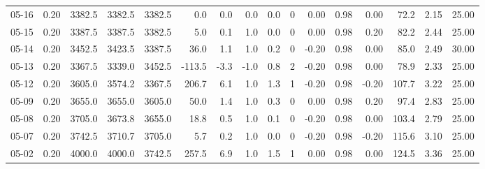\begin{threeparttable}
{\begin{tabular}{lrrrrrrrrrrrrrrr}
  05-16 &     0.20 & 3382.5 & 3382.5 & 3382.5 &        0.0 &            0.0 &                      0.0 &                 0.0 &              0 &       0.00 &      0.98 &           0.00 &             72.2 &            2.15 &                  25.00 \\
  05-15 &     0.20 & 3387.5 & 3387.5 & 3382.5 &        5.0 &            0.1 &                      1.0 &                 0.0 &              0 &       0.00 &      0.98 &           0.20 &             82.2 &            2.44 &                  25.00 \\
  05-14 &     0.20 & 3452.5 & 3423.5 & 3387.5 &       36.0 &            1.1 &                      1.0 &                 0.2 &              0 &      -0.20 &      0.98 &           0.00 &             85.0 &            2.49 &                  30.00 \\
  05-13 &     0.20 & 3367.5 & 3339.0 & 3452.5 &     -113.5 &           -3.3 &                     -1.0 &                 0.8 &              2 &      -0.20 &      0.98 &           0.00 &             78.9 &            2.33 &                  25.00 \\
  05-12 &     0.20 & 3605.0 & 3574.2 & 3367.5 &      206.7 &            6.1 &                      1.0 &                 1.3 &              1 &      -0.20 &      0.98 &          -0.20 &            107.7 &            3.22 &                  25.00 \\
  05-09 &     0.20 & 3655.0 & 3655.0 & 3605.0 &       50.0 &            1.4 &                      1.0 &                 0.3 &              0 &       0.00 &      0.98 &           0.20 &             97.4 &            2.83 &                  25.00 \\
  05-08 &     0.20 & 3705.0 & 3673.8 & 3655.0 &       18.8 &            0.5 &                      1.0 &                 0.1 &              0 &      -0.20 &      0.98 &           0.00 &            103.4 &            2.79 &                  25.00 \\
  05-07 &     0.20 & 3742.5 & 3710.7 & 3705.0 &        5.7 &            0.2 &                      1.0 &                 0.0 &              0 &      -0.20 &      0.98 &          -0.20 &            115.6 &            3.10 &                  25.00 \\
  05-02 &     0.20 & 4000.0 & 4000.0 & 3742.5 &      257.5 &            6.9 &                      1.0 &                 1.5 &              1 &       0.00 &      0.98 &           0.00 &            124.5 &            3.36 &                  25.00 \\

\end{tabular}}
\end{threeparttable}
